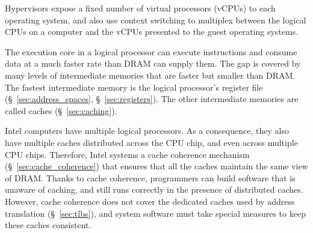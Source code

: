 Hypervisors expose a fixed number of virtual processors (vCPUs) to each
operating system, and also use context switching to multiplex between the
logical CPUs on a computer and the vCPUs presented to the guest operating
systems.

The execution core in a logical processor can execute instructions and consume
data at a much faster rate than DRAM can supply them. The gap is covered by
many levels of intermediate memories that are faster but smaller than DRAM. The
fastest intermediate memory is the logical processor's register file
(\S~\ref{sec:address_spaces}, \S~\ref{sec:registers}). The other intermediate
memories are called caches (\S~\ref{sec:caching}).

Intel computers have multiple logical processors. As a consequence, they also
have multiple caches distributed across the CPU chip, and even across multiple
CPU chips. Therefore, Intel systems a cache coherence mechanism
(\S~\ref{sec:cache_coherence}) that ensures that all the caches maintain the
same view of DRAM. Thanks to cache coherence, programmers can build software
that is unaware of caching, and still runs correctly in the presence of
distributed caches. However, cache coherence does not cover the dedicated
caches used by address translation (\S~\ref{sec:tlbs}), and system software
must take special measures to keep these caches consistent.


